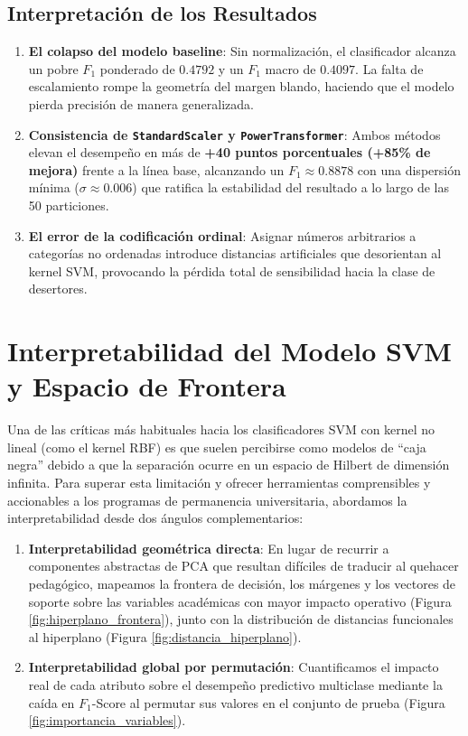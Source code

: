\documentclass[12pt,a4paper]{article}
\begin{document}
\subsection{Interpretación de los Resultados}
\begin{enumerate}
    \item \textbf{El colapso del modelo baseline}: Sin normalización, el clasificador alcanza un pobre $F_1$ ponderado de $0.4792$ y un $F_1$ macro de $0.4097$. La falta de escalamiento rompe la geometría del margen blando, haciendo que el modelo pierda precisión de manera generalizada.
    \item \textbf{Consistencia de \texttt{StandardScaler} y \texttt{PowerTransformer}}: Ambos métodos elevan el desempeño en más de \textbf{+40 puntos porcentuales (+85\% de mejora)} frente a la línea base, alcanzando un $F_1 \approx 0.8878$ con una dispersión mínima ($\sigma \approx 0.006$) que ratifica la estabilidad del resultado a lo largo de las 50 particiones.
    \item \textbf{El error de la codificación ordinal}: Asignar números arbitrarios a categorías no ordenadas introduce distancias artificiales que desorientan al kernel SVM, provocando la pérdida total de sensibilidad hacia la clase de desertores.
\end{enumerate}

\section{Interpretabilidad del Modelo SVM y Espacio de Frontera}

Una de las críticas más habituales hacia los clasificadores SVM con kernel no lineal (como el kernel RBF) es que suelen percibirse como modelos de ``caja negra'' debido a que la separación ocurre en un espacio de Hilbert de dimensión infinita. Para superar esta limitación y ofrecer herramientas comprensibles y accionables a los programas de permanencia universitaria, abordamos la interpretabilidad desde dos ángulos complementarios:
\begin{enumerate}
    \item \textbf{Interpretabilidad geométrica directa}: En lugar de recurrir a componentes abstractas de PCA que resultan difíciles de traducir al quehacer pedagógico, mapeamos la frontera de decisión, los márgenes y los vectores de soporte sobre las variables académicas con mayor impacto operativo (Figura \ref{fig:hiperplano_frontera}), junto con la distribución de distancias funcionales al hiperplano (Figura \ref{fig:distancia_hiperplano}).
    \item \textbf{Interpretabilidad global por permutación}: Cuantificamos el impacto real de cada atributo sobre el desempeño predictivo multiclase mediante la caída en $F_1$-Score al permutar sus valores en el conjunto de prueba (Figura \ref{fig:importancia_variables}).
\end{enumerate}
\end{document}
